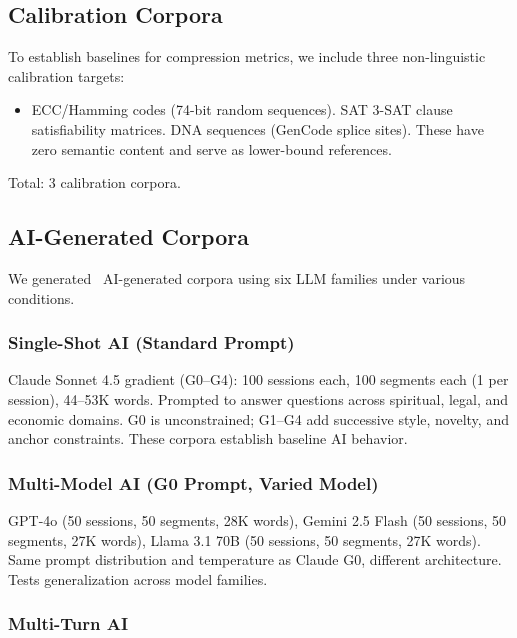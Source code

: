\documentclass[final]{clv2025}
\begin{document}
\subsection{Calibration Corpora}

To establish baselines for compression metrics, we include three non-linguistic calibration targets:

\begin{itemize}
\item ECC/Hamming codes (74-bit random sequences). SAT 3-SAT clause satisfiability matrices. DNA sequences (GenCode splice sites). These have zero semantic content and serve as lower-bound references.
\end{itemize}

Total: 3 calibration corpora.

\subsection{AI-Generated Corpora}

We generated \nAI\ AI-generated corpora using six LLM families under various conditions.

\subsubsection{Single-Shot AI (Standard Prompt)}

Claude Sonnet 4.5 gradient (G0--G4): 100 sessions each, 100 segments each (1 per session), 44--53K words. Prompted to answer questions across spiritual, legal, and economic domains. G0 is unconstrained; G1--G4 add successive style, novelty, and anchor constraints. These corpora establish baseline AI behavior.

\subsubsection{Multi-Model AI (G0 Prompt, Varied Model)}

GPT-4o (50 sessions, 50 segments, 28K words), Gemini 2.5 Flash (50 sessions, 50 segments, 27K words), Llama 3.1 70B (50 sessions, 50 segments, 27K words). Same prompt distribution and temperature as Claude G0, different architecture. Tests generalization across model families.

\subsubsection{Multi-Turn AI}
\end{document}
